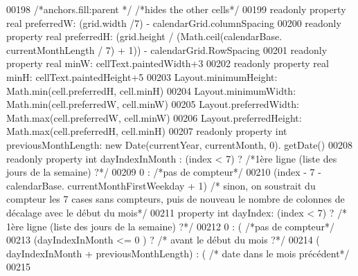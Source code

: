 \begin{DoxyCode}
{{{00198                         \textcolor{comment}{/*anchors.fill:parent */} \textcolor{comment}{/*hides the other cells*/}
00199                         readonly \textcolor{keyword}{property} real preferredW: (grid.width /7) - calendarGrid.columnSpacing
00200                         readonly property real preferredH: (grid.height / (Math.ceil(calendarBase.
      currentMonthLength / 7) + 1)) - calendarGrid.RowSpacing
00201                         readonly \textcolor{keyword}{property} real minW: cellText.paintedWidth+3
00202                         readonly \textcolor{keyword}{property} real minH: cellText.paintedHeight+5
00203                         Layout.minimumHeight: Math.min(cell.preferredH, cell.minH)
00204                         Layout.minimumWidth: Math.min(cell.preferredW, cell.minW)
00205                         Layout.preferredWidth: Math.max(cell.preferredW, cell.minW)
00206                         Layout.preferredHeight: Math.max(cell.preferredH, cell.minH)
00207                         readonly \textcolor{keyword}{property} \textcolor{keywordtype}{int} previousMonthLength: \textcolor{keyword}{new} Date(currentYear, currentMonth, 0).
      getDate()
00208                         readonly \textcolor{keyword}{property} \textcolor{keywordtype}{int} dayIndexInMonth : (index < 7) ?  \textcolor{comment}{/*1ère ligne (liste des
       jours de la semaine) ?*/}
00209                                                                               0 : \textcolor{comment}{/*pas de compteur*/}
00210                                                                               (index - 7 - calendarBase.
      currentMonthFirstWeekday + 1) \textcolor{comment}{/* sinon, on soustrait du compteur les 7 cases sans compteurs, puis de nouveau le
       nombre de colonnes de décalage avec le début du mois*/}
00211                         \textcolor{keyword}{property} \textcolor{keywordtype}{int} dayIndex: (index < 7) ? \textcolor{comment}{/* 1ère ligne (liste des jours de la semaine)
       ?*/}
00212                                                              0 : ( \textcolor{comment}{/*pas de compteur*/}
00213                                                                   (dayIndexInMonth <= 0 ) ? \textcolor{comment}{/* avant le
       début du mois ?*/}
00214                                                                                             (
      dayIndexInMonth + previousMonthLength) : ( \textcolor{comment}{/* date dans le mois précédent*/}
00215                                                                                                            
}}}
\end{DoxyCode}
